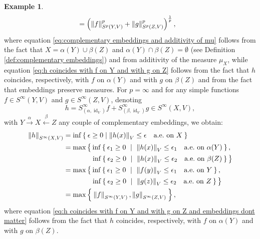\documentclass{amsart}
\theoremstyle{definition}
\newtheorem{example}[definition]{Example}
\theoremstyle{plain}
\newcommand{\norm}[1]{\left\lVert #1\right\rVert} %
\newcommand{\id}{\operatorname{id}}
\begin{document}
\begin{example}
\begin{align}
                &= \left( \norm{f}_{S^p(Y,V)}^p + \norm{g}_{S^p(Z,V)}^p \right)^{\frac{1}{p}}, \notag
            \end{align}
            where equation \eqref{eq:complementary embeddings and additivity of mu} follows from the fact that $X = \alpha(Y) \cup \beta(Z)$ and $\alpha(Y) \cap \beta(Z) = \emptyset$ (see Definition \ref{def:complementary embeddings}) and from additivity of the measure $\mu_X$, while equation \eqref{eq:h coincides with f on Y and with g on Z} follows from the fact that $h$ coincides, respectively, with $f$ on $\alpha(Y)$ and with $g$ on $\beta(Z)$ and from the fact that embeddings preserve measures. 
            For $p = \infty$ and for any simple functions $f \in S^\infty{(Y,V)}$ and $g \in S^\infty{(Z,V)}$, denoting 
            \begin{equation*}
                h = S^\infty_{(\alpha,\id_V)}f + S^\infty_{(\beta,\id_V)}g \in S^\infty{(X,V)},
            \end{equation*}
            with $Y \xrightarrow{~\alpha~} X \xleftarrow{~\beta~} Z$ any couple of complementary embeddings, we obtain:
            \begin{align}
                \norm{h}_{S^\infty(X,V)} &= \inf \Set{\epsilon \geq 0 | \norm{h(x)}_V \leq \epsilon \quad \text{a.e.~on} ~ X} \notag \\
                &= \max \big\{ \inf \Set{\epsilon_1 \geq 0 ~|~ \norm{h(x)}_V \leq \epsilon_1 \quad \text{a.e.~on} ~ \alpha(Y)}, \notag \\
                &\qquad \qquad \inf \Set{\epsilon_2 \geq 0 ~|~ \norm{h(x)}_V \leq \epsilon_2 \quad \text{a.e.~on} ~ \beta(Z)} \big\} \notag \\
                &= \max \big\{ \inf \Set{\epsilon_1 \geq 0 ~|~ \norm{f(y)}_V \leq \epsilon_1 \quad \text{a.e.~on} ~ Y}, \label{eq:h coincides with f on Y and with g on Z and embeddings dont matter} \\
                &\qquad \qquad \inf \Set{\epsilon_2 \geq 0 ~|~ \norm{g(z)}_V \leq \epsilon_2 \quad \text{a.e.~on} ~ Z} \big\} \notag \\
                &= \max \Set{\norm{f}_{S^\infty(Y,V)},\norm{g}_{S^\infty(Z,V)}}, \notag
            \end{align}
            where equation \eqref{eq:h coincides with f on Y and with g on Z and embeddings dont matter} follows from the fact that $h$ coincides, respectively, with $f$ on $\alpha(Y)$ and with $g$ on $\beta(Z)$.
        \end{example}
\end{document}
